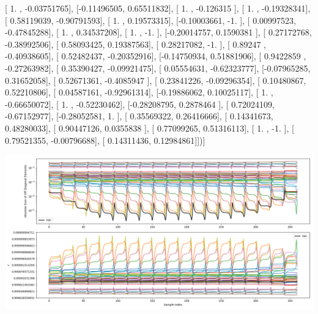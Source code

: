 \documentclass{article}
\begin{document}
       [ 1.        , -0.03751765],
       [-0.11496505,  0.65511832],
       [ 1.        , -0.126315  ],
       [ 1.        , -0.19328341],
       [ 0.58119039, -0.90791593],
       [ 1.        ,  0.19573315],
       [-0.10003661, -1.        ],
       [ 0.00997523, -0.47845288],
       [ 1.        ,  0.34537208],
       [ 1.        , -1.        ],
       [-0.20014757,  0.1590381 ],
       [ 0.27172768, -0.38992506],
       [ 0.58093425,  0.19387563],
       [ 0.28217082, -1.        ],
       [ 0.89247   , -0.40938605],
       [ 0.52482437, -0.20352916],
       [-0.14750934,  0.51881906],
       [ 0.9422859 , -0.27263982],
       [ 0.35390427, -0.09921475],
       [ 0.05554631, -0.62323777],
       [-0.07965285,  0.31652058],
       [ 0.52671361, -0.4085947 ],
       [ 0.23841226, -0.09296354],
       [ 0.10480867,  0.52210806],
       [ 0.04587161, -0.92961314],
       [-0.19886062,  0.10025117],
       [ 1.        , -0.66650072],
       [ 1.        , -0.52230462],
       [-0.28208795,  0.2878464 ],
       [ 0.72024109, -0.67152977],
       [-0.28052581,  1.        ],
       [ 0.35569322,  0.26416666],
       [ 0.14341673,  0.48280033],
       [ 0.90447126,  0.0355838 ],
       [ 0.77099265,  0.51316113],
       [ 1.        , -1.        ],
       [ 0.79521355, -0.00796688],
       [ 0.14311436,  0.12984861]])]
\begin{center}
\includegraphics[scale=.9]{report_pickled_controls232/control_dpn_all.png}

\end{center}
\end{document}
